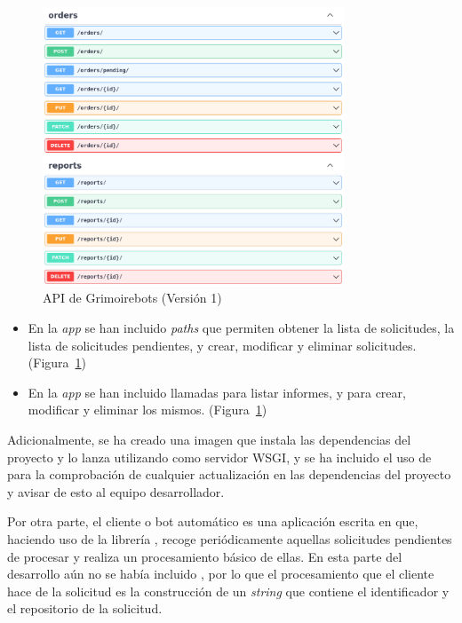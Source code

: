 \begin{figure}[ht]
    \centering
    \includegraphics[width=0.8\textwidth]{Figures/grimoirebots_i_api}
    \decoRule
    \caption[Grimoirebots I (API)]{API de Grimoirebots (Versión 1)}
    \label{fig:grimoirebots_i_api}
\end{figure}

\begin{itemize}
    \item En la \emph{app}  se han incluido \emph{paths} que permiten obtener la lista de solicitudes, la lista de solicitudes pendientes, y crear, modificar y eliminar solicitudes. (Figura~\ref{fig:grimoirebots_i_api})
    \item En la \emph{app}  se han incluido llamadas para listar informes, y para crear, modificar y eliminar los mismos. (Figura~\ref{fig:grimoirebots_i_api})
\end{itemize}

Adicionalmente, se ha creado una imagen  que instala las dependencias del proyecto y lo lanza utilizando  como servidor WSGI, y se ha incluido el uso de  para la comprobación de cualquier actualización en las dependencias del proyecto y avisar de esto al equipo desarrollador.

Por otra parte, el cliente o bot automático es una aplicación escrita en  que, haciendo uso de la librería , recoge periódicamente aquellas solicitudes pendientes de procesar y realiza un procesamiento básico de ellas. En esta parte del desarrollo aún no se había incluido , por lo que el procesamiento que el cliente hace de la solicitud es la construcción de un \emph{string} que contiene el identificador y el repositorio de la solicitud.

